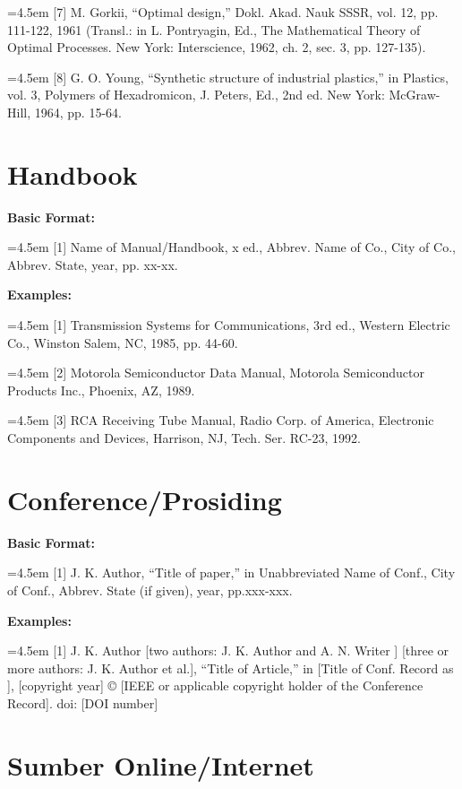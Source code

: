 \hangindent=4.5em 
[7] M. Gorkii, “Optimal design,” Dokl. Akad. Nauk SSSR, vol. 12, pp. 111-122, 1961 
(Transl.: in L. Pontryagin, Ed., The Mathematical Theory of Optimal Processes. New 
York: Interscience, 1962, ch. 2, sec. 3, pp. 127-135).

\hangindent=4.5em 
[8] G. O. Young, “Synthetic structure of industrial plastics,” in Plastics, vol. 3, Polymers of Hexadromicon, J. Peters, Ed., 2nd ed. New York: McGraw-Hill, 1964, pp. 15-64.

\newpage
\section*{Handbook}

\textbf{Basic Format:}

\hangindent=4.5em
[1] Name of Manual/Handbook, x ed., Abbrev. Name of Co., City of Co., Abbrev. State, year, pp. xx-xx.

\textbf{Examples:}

\hangindent=4.5em
[1] Transmission Systems for Communications, 3rd ed., Western Electric Co., 
Winston Salem, NC, 1985, pp. 44-60.

\hangindent=4.5em
[2] Motorola Semiconductor Data Manual, Motorola Semiconductor Products Inc., 
Phoenix, AZ, 1989.

\hangindent=4.5em
[3] RCA Receiving Tube Manual, Radio Corp. of America, Electronic Components and 
Devices, Harrison, NJ, Tech. Ser. RC-23, 1992.

\section*{Conference/Prosiding}

\textbf{Basic Format:}

\hangindent=4.5em
[1] J. K. Author, “Title of paper,” in Unabbreviated Name of Conf., City of Conf., Abbrev. State (if given), year, pp.xxx-xxx.

\textbf{Examples:}

\hangindent=4.5em
[1] J. K. Author [two authors: J. K. Author and A. N. Writer ] [three or more authors: J. K. Author et al.], “Title of Article,” in [Title of Conf. Record as ], [copyright year] © [IEEE or applicable copyright holder of the Conference Record]. doi: [DOI number]

\section*{Sumber Online/Internet}

